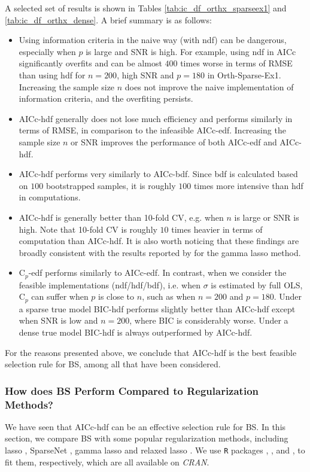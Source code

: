 A selected set of results is shown in Tables \ref{tab:ic_df_orthx_sparseex1} and \ref{tab:ic_df_orthx_dense}. A brief summary is as follows:
\begin{itemize}
	\item Using information criteria in the naive way (with ndf) can be dangerous, especially when $p$ is large and SNR is high. For example, using ndf in AICc significantly overfits and can be almost $400$ times worse in terms of RMSE than using hdf for $n=200$, high SNR and $p=180$ in Orth-Sparse-Ex1. Increasing the sample size $n$ does not improve the naive implementation of information criteria, and the overfiting persists.
	\item AICc-hdf generally does not lose much efficiency and performs similarly in terms of RMSE, in comparison to the infeasible AICc-edf. Increasing the sample size $n$ or SNR improves the performance of both AICc-edf and AICc-hdf. 
	\item AICc-hdf performs very similarly to AICc-bdf. Since bdf is calculated based on $100$ bootstrapped samples, it is roughly $100$ times more intensive than hdf in computations. 
	\item AICc-hdf is generally better than 10-fold CV, e.g. when $n$ is large or SNR is high. Note that 10-fold CV is roughly $10$ times heavier in terms of computation than AICc-hdf. It is also worth noticing that these findings are broadly consistent with the results reported by \citet{Taddy2017} for the gamma lasso method. 
	\item C$_p$-edf performs similarly to AICc-edf. In contrast, when we consider the feasible implementations (ndf/hdf/bdf), i.e. when $\sigma$ is estimated by full OLS, C$_p$ can suffer when $p$ is close to $n$, such as when $n=200$ and $p=180$. Under a sparse true model BIC-hdf performs slightly better than AICc-hdf except when SNR is low and $n=200$, where BIC is considerably worse. Under a dense true model BIC-hdf is always outperformed by AICc-hdf. 
\end{itemize}
For the reasons presented above, we conclude that AICc-hdf is the best feasible selection rule for BS, among all that have been considered.






\subsubsection{How does BS Perform Compared to Regularization Methods?}
\label{sec:bs_regu}
We have seen that AICc-hdf can be an effective selection rule for BS. In this section, we compare BS with some popular regularization methods, including lasso \citep{Tibshirani1996}, SparseNet \citep{Mazumder2011}, gamma lasso \citep{Taddy2017} and relaxed lasso \citep{Meinshausen2007}. We use {\tt{R}} packages  \citep{Friedman2010},  \citep{Mazumder2011},  \citep{Taddy2017} and  \citep{Meinshausen2012}, to fit them, respectively, which are all available on \textit{CRAN}.

